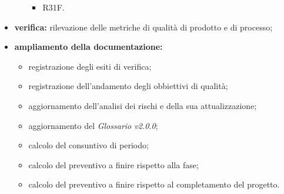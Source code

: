 \begin{itemize}
\begin{itemize}
                    \begin{itemize}
                        \item R31F.
                    \end{itemize}
          \end{itemize}
    \item \textbf{verifica:} rilevazione delle metriche di qualità di prodotto e di processo;
    \item \textbf{ampliamento della documentazione:}
          \begin{itemize}
              \item registrazione degli esiti di verifica;
              \item registrazione dell'andamento degli obbiettivi di qualità;
              \item aggiornamento dell'analisi dei rischi e della sua attualizzazione;
              \item aggiornamento del \textit{Glossario v2.0.0};
              \item calcolo del consuntivo di periodo;
              \item calcolo del preventivo a finire rispetto alla fase;
              \item calcolo del preventivo a finire rispetto al completamento del progetto.
          \end{itemize}
\end{itemize}

